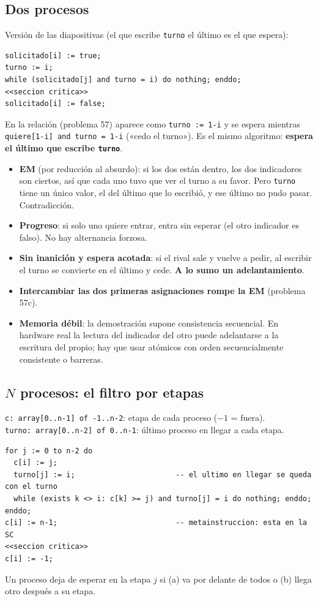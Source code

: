 \documentclass[11pt,a4paper,oneside]{report}
\begin{document}
\subsection{Dos procesos}
Versión de las diapositivas (el que escribe \texttt{turno} el último es el que espera):
\begin{lstlisting}
solicitado[i] := true;
turno := i;
while (solicitado[j] and turno = i) do nothing; enddo;
<<seccion critica>>
solicitado[i] := false;
\end{lstlisting}
En la relación (problema 57) aparece como \texttt{turno := 1-i} y se espera mientras
\texttt{quiere[1-i] and turno = 1-i} («cedo el turno»). Es el mismo algoritmo: \textbf{espera el último que
escribe \texttt{turno}}.
\begin{itemize}[leftmargin=*]
  \item \textbf{EM} (por reducción al absurdo): si los dos están dentro, los dos indicadores son ciertos, así que
        cada uno tuvo que ver el turno a su favor. Pero \texttt{turno} tiene un único valor, el del último que
        lo escribió, y ese último no pudo pasar. Contradicción.
  \item \textbf{Progreso}: si solo uno quiere entrar, entra sin esperar (el otro indicador es falso). No hay
        alternancia forzosa.
  \item \textbf{Sin inanición y espera acotada}: si el rival sale y vuelve a pedir, al escribir el turno se
        convierte en el último y cede. \textbf{A lo sumo un adelantamiento}.
  \item \textbf{Intercambiar las dos primeras asignaciones rompe la EM} (problema 57c).
  \item \textbf{Memoria débil}: la demostración supone consistencia secuencial. En hardware real la lectura del
        indicador del otro puede adelantarse a la escritura del propio; hay que usar atómicos con orden
        secuencialmente consistente o barreras.
\end{itemize}

\subsection{$N$ procesos: el filtro por etapas}
\texttt{c: array[0..n-1] of -1..n-2}: etapa de cada proceso ($-1$ = fuera).\\
\texttt{turno: array[0..n-2] of 0..n-1}: último proceso en llegar a cada etapa.
\begin{lstlisting}
for j := 0 to n-2 do
  c[i] := j;
  turno[j] := i;                       -- el ultimo en llegar se queda con el turno
  while (exists k <> i: c[k] >= j) and turno[j] = i do nothing; enddo;
enddo;
c[i] := n-1;                           -- metainstruccion: esta en la SC
<<seccion critica>>
c[i] := -1;
\end{lstlisting}
Un proceso deja de esperar en la etapa $j$ si (a) va por delante de todos o (b) llega otro después a su etapa.
\end{document}
